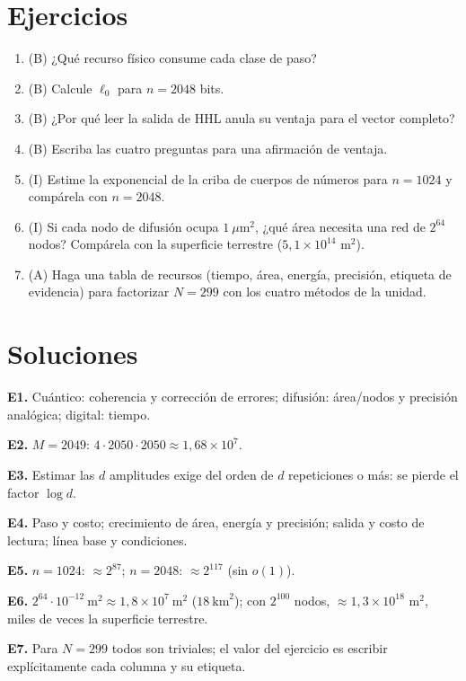 \documentclass[11pt,a4paper]{article}
\begin{document}
\section{Ejercicios}
\begin{enumerate}[label=\textbf{E\arabic*.}]
\item (B) ¿Qué recurso físico consume cada clase de paso?
\item (B) Calcule $\ell_0$ para $n=2048$ bits.
\item (B) ¿Por qué leer la salida de HHL anula su ventaja para el vector completo?
\item (B) Escriba las cuatro preguntas para una afirmación de ventaja.
\item (I) Estime la exponencial de la criba de cuerpos de números para $n=1024$ y compárela con $n=2048$.
\item (I) Si cada nodo de difusión ocupa $1\ \mu\text{m}^2$, ¿qué área necesita una red de $2^{64}$ nodos? Compárela con la superficie terrestre ($5{,}1\times10^{14}$ m$^2$).
\item (A) Haga una tabla de recursos (tiempo, área, energía, precisión, etiqueta de evidencia) para factorizar $N=299$ con los cuatro métodos de la unidad.
\end{enumerate}
\section{Soluciones}
\begin{solucion}
\textbf{E1.} Cuántico: coherencia y corrección de errores; difusión: área/nodos y precisión analógica; digital: tiempo.

\textbf{E2.} $M=2049$: $4\cdot2050\cdot2050\approx1{,}68\times10^7$.

\textbf{E3.} Estimar las $d$ amplitudes exige del orden de $d$ repeticiones o más: se pierde el factor $\log d$.

\textbf{E4.} Paso y costo; crecimiento de área, energía y precisión; salida y costo de lectura; línea base y condiciones.

\textbf{E5.} $n=1024$: $\approx2^{87}$; $n=2048$: $\approx2^{117}$ (sin $o(1)$).

\textbf{E6.} $2^{64}\cdot10^{-12}\ \text{m}^2\approx1{,}8\times10^7\ \text{m}^2$ ($18\ \text{km}^2$); con $2^{100}$ nodos, $\approx1{,}3\times10^{18}$ m$^2$, miles de veces la superficie terrestre.

\textbf{E7.} Para $N=299$ todos son triviales; el valor del ejercicio es escribir explícitamente cada columna y su etiqueta.
\end{solucion}
\end{document}
